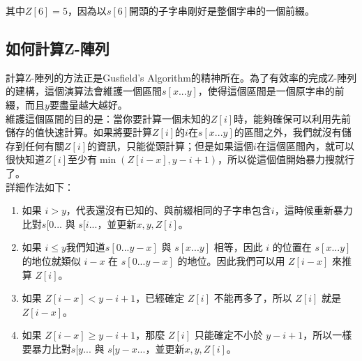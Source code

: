 \documentclass[main.tex]{subfiles}
\begin{document}
\begin{center}
\end{center}

其中$Z[6]=5$，因為以$s[6]$開頭的子字串剛好是整個字串的一個前綴。\\

\subsection{如何計算Z-陣列}

計算Z-陣列的方法正是Gusfield's Algorithm的精神所在。為了有效率的完成Z-陣列的建構，這個演算法會維護一個區間$s[x...y]$，使得這個區間是一個原字串的前綴，而且$y$要盡量越大越好。\\

維護這個區間的目的是：當你要計算一個未知的$Z[i]$時，能夠確保可以利用先前儲存的值快速計算。如果將要計算$Z[i]$的$i$在$s[x...y]$的區間之外，我們就沒有儲存到任何有關$Z[i]$的資訊，只能從頭計算；但是如果這個$i$在這個區間內，就可以很快知道$Z[i]$至少有$\min(Z[i-x], y-i+1)$，所以從這個值開始暴力搜就行了。\\

詳細作法如下：
\begin{enumerate}
\item 如果 $i>y$，代表還沒有已知的、與前綴相同的子字串包含$i$，這時候重新暴力比對$s[0...$ 與 $s[i...$，並更新$x, y, Z[i]$。
\item 如果 $i\leq y$我們知道$s[0...y-x]$ 與 $s[x...y]$ 相等，因此 $i$ 的位置在 $s[x...y]$ 的地位就類似 $i-x$ 在 $s[0...y-x]$ 的地位。因此我們可以用 $Z[i-x]$ 來推算 $Z[i]$。
\item 如果 $Z[i-x] < y-i+1$，已經確定 $Z[i]$ 不能再多了，所以 $Z[i]$ 就是 $Z[i-x]$。
\item 如果 $Z[i-x] \geq y-i+1$，那麼 $Z[i]$ 只能確定不小於 $y-i+1$，所以一樣要暴力比對$s[y...$ 與 $s[y-x...$，並更新$x, y, Z[i]$。
\end{enumerate}
\end{document}
